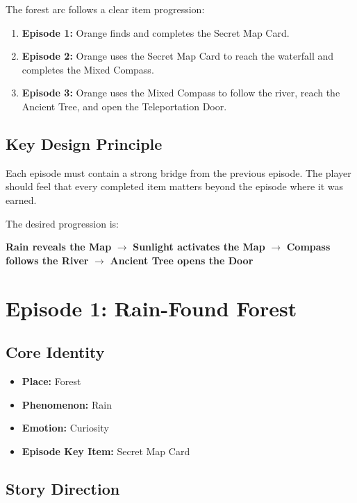 \documentclass[12pt]{article}
\begin{document}
The forest arc follows a clear item progression:

\begin{enumerate}[leftmargin=*]
    \item \textbf{Episode 1:} Orange finds and completes the Secret Map Card.
    \item \textbf{Episode 2:} Orange uses the Secret Map Card to reach the waterfall and completes the Mixed Compass.
    \item \textbf{Episode 3:} Orange uses the Mixed Compass to follow the river, reach the Ancient Tree, and open the Teleportation Door.
\end{enumerate}

\subsection{Key Design Principle}

Each episode must contain a strong bridge from the previous episode. The player should feel that every completed item matters beyond the episode where it was earned.

The desired progression is:

\begin{center}
\textbf{Rain reveals the Map} $\rightarrow$
\textbf{Sunlight activates the Map} $\rightarrow$
\textbf{Compass follows the River} $\rightarrow$
\textbf{Ancient Tree opens the Door}
\end{center}

\section{Episode 1: Rain-Found Forest}

\subsection{Core Identity}

\begin{itemize}[leftmargin=*]
    \item \textbf{Place:} Forest
    \item \textbf{Phenomenon:} Rain
    \item \textbf{Emotion:} Curiosity
    \item \textbf{Episode Key Item:} Secret Map Card
\end{itemize}

\subsection{Story Direction}
\end{document}
